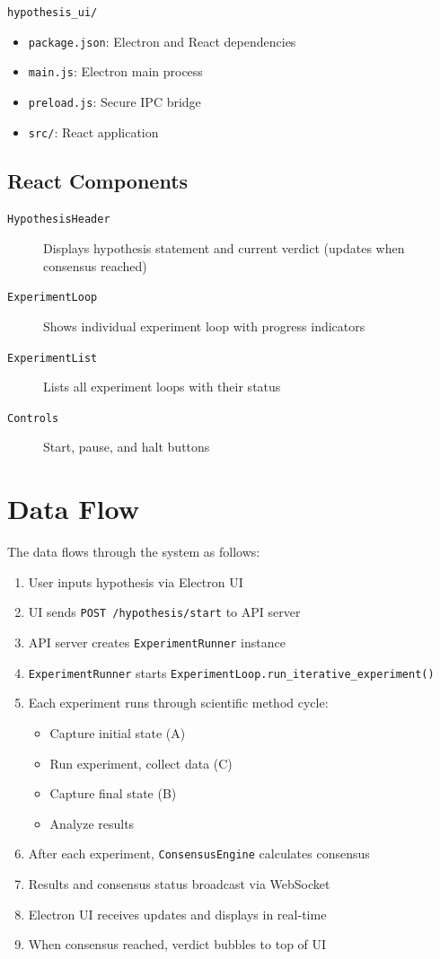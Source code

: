 \documentclass{book}
\begin{document}
\texttt{hypothesis\_ui/}

\begin{itemize}
    \item \texttt{package.json}: Electron and React dependencies
    \item \texttt{main.js}: Electron main process
    \item \texttt{preload.js}: Secure IPC bridge
    \item \texttt{src/}: React application
\end{itemize}

\subsection{React Components}

\begin{description}
    \item[\texttt{HypothesisHeader}] Displays hypothesis statement and current verdict (updates when consensus reached)
    \item[\texttt{ExperimentLoop}] Shows individual experiment loop with progress indicators
    \item[\texttt{ExperimentList}] Lists all experiment loops with their status
    \item[\texttt{Controls}] Start, pause, and halt buttons
\end{description}

\section{Data Flow}

The data flows through the system as follows:

\begin{enumerate}
    \item User inputs hypothesis via Electron UI
    \item UI sends \texttt{POST /hypothesis/start} to API server
    \item API server creates \texttt{ExperimentRunner} instance
    \item \texttt{ExperimentRunner} starts \texttt{ExperimentLoop.run\_iterative\_experiment()}
    \item Each experiment runs through scientific method cycle:
    \begin{itemize}
        \item Capture initial state (A)
        \item Run experiment, collect data (C)
        \item Capture final state (B)
        \item Analyze results
    \end{itemize}
    \item After each experiment, \texttt{ConsensusEngine} calculates consensus
    \item Results and consensus status broadcast via WebSocket
    \item Electron UI receives updates and displays in real-time
    \item When consensus reached, verdict bubbles to top of UI
\end{enumerate}
\end{document}
